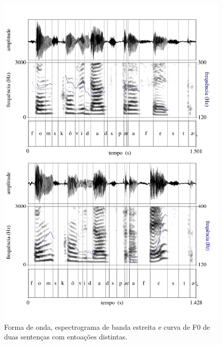 \documentclass[portuguese]{textolivre}
\begin{document}
\begin{figure}[H]
 \centering
 \includegraphics[width=1\textwidth]{Fig17.pdf}
 \caption{Forma de onda, espectrograma de banda estreita e curva de F0 de duas sentenças com entoações distintas.}
 \label{fig17}
\end{figure}
\end{document}
